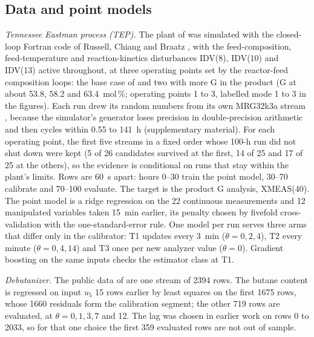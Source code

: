 \subsection{Data and point models}\label{sec:study:data}

\emph{Tennessee Eastman process (TEP).} The plant of \citet{downs1993} was simulated with the closed-loop
Fortran code of Russell, Chiang and Braatz \citep{russell2000}, with the feed-composition,
feed-temperature and reaction-kinetics disturbances IDV(8), IDV(10) and IDV(13) active
throughout, at three operating points set by the reactor-feed composition loops: the base case of
\citet{downs1993} and two with more G in the product (G at about 53.8, 58.2 and 63.4~mol\,\%;
operating points 1 to 3, labelled mode 1 to 3 in the figures). Each run drew its random
numbers from its own MRG32k3a stream \citep{lecuyer1999}, because the simulator's generator loses
precision in double-precision arithmetic \citep{kitchin2026} and then cycles within 0.55 to
141~h (supplementary material). For each operating point, the first five streams in a fixed
order whose 100-h run did not shut down were kept (5 of 26 candidates survived at the first, 14 of
25 and 17 of 25 at the others), so the evidence is conditional on runs that stay within the
plant's limits. Rows are 60~s apart: hours 0--30 train the point model, 30--70 calibrate and
70--100 evaluate. The target is the product G analysis, XMEAS(40). The point model is a ridge
regression on the 22 continuous measurements and 12 manipulated variables taken 15~min earlier,
its penalty chosen by fivefold cross-validation with the one-standard-error rule. One model per
run serves three arms that differ only in the calibrator: T1 updates every 3~min
($\theta = 0, 2, 4$), T2 every minute ($\theta = 0, 4, 14$) and T3 once per new analyzer value
($\theta = 0$). Gradient boosting on the same inputs checks the estimator class at T1.

\emph{Debutanizer.} The public data of \citet{fortuna2007} are one stream of 2394 rows. The butane
content is regressed on input $u_5$ 15 rows earlier by least squares on the first 1675 rows, whose
1660 residuals form the calibration segment; the other 719 rows are evaluated, at
$\theta = 0, 1, 3, 7$ and 12. The lag was chosen in earlier work on rows 0 to 2033, so for that one
choice the first 359 evaluated rows are not out of sample.

